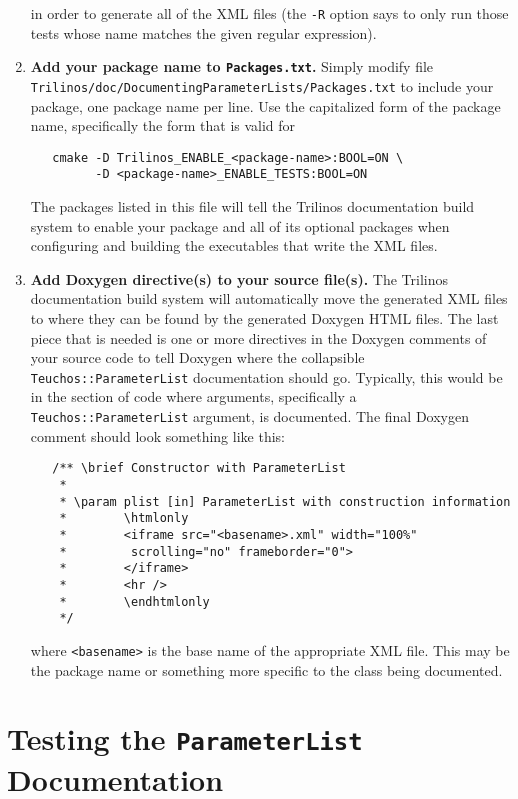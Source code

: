 \documentclass[pdf,ps2pdf,12pt]{smemo}
\begin{document}
\begin{memo}
\begin{enumerate}
  in order to generate all of the XML files (the \texttt{-R} option
  says to only run those tests whose name matches the given regular
  expression).

\item \textbf{Add your package name to \texttt{Packages.txt}.} Simply
  modify file
  \texttt{Trilinos/\-doc/\-Documenting\-Parameter\-Lists/\-Packages.txt}
  to include your package, one package name per line.  Use the
  capitalized form of the package name, specifically the form that is
  valid for

 \begin{verbatim}
   cmake -D Trilinos_ENABLE_<package-name>:BOOL=ON \
         -D <package-name>_ENABLE_TESTS:BOOL=ON
 \end{verbatim}

  The packages listed in this file will tell the Trilinos
  documentation build system to enable your package and all of its
  optional packages when configuring and building the executables that
  write the XML files.

\item \textbf{Add Doxygen directive(s) to your source file(s).} The
  Trilinos documentation build system will automatically move the
  generated XML files to where they can be found by the generated
  Doxygen HTML files. The last piece that is needed is one or more
  directives in the Doxygen comments of your source code to tell
  Doxygen where the collapsible \texttt{Teuchos::ParameterList}
  documentation should go. Typically, this would be in the section of
  code where arguments, specifically a \texttt{Teuchos::ParameterList}
  argument, is documented. The final Doxygen comment should look
  something like this:

 \begin{verbatim}
   /** \brief Constructor with ParameterList
    * 
    * \param plist [in] ParameterList with construction information
    *        \htmlonly
    *        <iframe src="<basename>.xml" width="100%"
    *         scrolling="no" frameborder="0">
    *        </iframe>
    *        <hr />
    *        \endhtmlonly
    */
 \end{verbatim}

  where \texttt{<basename>} is the base name of the appropriate XML
  file.  This may be the package name or something more specific to
  the class being documented.

\end{enumerate}

\section{Testing the \texttt{ParameterList} Documentation}


\end{memo}
\end{document}
